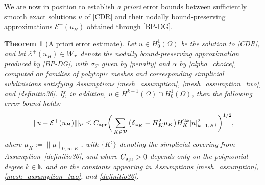 \documentclass[11pt,final]{amsart}
\theoremstyle{plain}
\newtheorem{theorem}{Theorem}[section]
\theoremstyle{definition}
\newcommand\calP{{\mathcal{P}}}
\newcommand\calT{{\mathcal{T}}}
\newcommand{\mesh}{\calP}
\newcommand{\ndgp}[1]{| \kern -.25mm \|{#1}| \kern -.25mm \|_{\rm \mesh}}
\renewcommand{\k}{K}
\newcommand{\ksh}{{K^{\sharp}}}
\begin{document}
We are now in position to establish \emph{a priori} error bounds between
sufficiently smooth exact solutions $u$ of \eqref{CDR} and their nodally
bound-preserving approximations $\mathcal{E}^+(u_H)$ obtained through
\eqref{BP-DG}. 

\begin{theorem}[A priori error estimate]
  \label{thm:a_priori}
Let $u\in H^1_0(\Omega)$ be the solution to \eqref{CDR}, and let
$\mathcal{E}^+(u_H)\in W_\calT$ denote the nodally bound-preserving
approximation produced by \eqref{BP-DG}, with $\sigma_\mesh$ given by
\eqref{penalty} and $\alpha$ by \eqref{alpha_choice}, computed on
families of polytopic meshes and corresponding simplicial subdivisions
satisfying Assumptions \ref{mesh_assumption},
\ref{mesh_assumption_two}, and \ref{definitio36}. If, in addition,
$u\in H^{k+1}(\Omega)\cap H^1_0(\Omega)$, then the following error bound
holds:
\begin{equation}\label{a_priori_bound}
		\ndgp{u-\mathcal{E}^+(u_H)}\le  C_{\rm apr}\bigg(\sum_{\k\in\mesh}\big(\delta_{\omega_\k}+ H_\k^2\mu_\k\big)
		H_{\k}^{2k} |u|_{k+1,\ksh}^2\bigg)^{1/2},
\end{equation} 
where $\mu_\k:=\|\mu\|_{0,\infty,\k}$, with $\{\ksh\}$ denoting the
simplicial covering from Assumption~\ref{definitio36}, and where
$C_{\rm apr}>0$ depends only on the polynomial degree
$k\in\mathbb{N}$ and on the constants appearing in Assumptions
\ref{mesh_assumption}, \ref{mesh_assumption_two}, and \ref{definitio36}.
\end{theorem}
\end{document}
